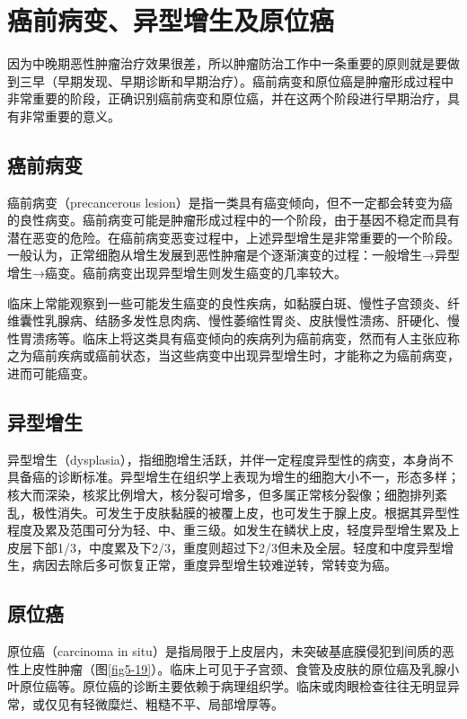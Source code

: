 \section{癌前病变、异型增生及原位癌}

因为中晚期恶性肿瘤治疗效果很差，所以肿瘤防治工作中一条重要的原则就是要做到三早（早期发现、早期诊断和早期治疗）。癌前病变和原位癌是肿瘤形成过程中非常重要的阶段，正确识别癌前病变和原位癌，并在这两个阶段进行早期治疗，具有非常重要的意义。

\subsection{癌前病变}

癌前病变（precancerous
lesion）是指一类具有癌变倾向，但不一定都会转变为癌的良性病变。癌前病变可能是肿瘤形成过程中的一个阶段，由于基因不稳定而具有潜在恶变的危险。在癌前病变恶变过程中，上述异型增生是非常重要的一个阶段。一般认为，正常细胞从增生发展到恶性肿瘤是个逐渐演变的过程：一般增生→异型增生→癌变。癌前病变出现异型增生则发生癌变的几率较大。

临床上常能观察到一些可能发生癌变的良性疾病，如黏膜白斑、慢性子宫颈炎、纤维囊性乳腺病、结肠多发性息肉病、慢性萎缩性胃炎、皮肤慢性溃疡、肝硬化、慢性胃溃疡等。临床上将这类具有癌变倾向的疾病列为癌前病变，然而有人主张应称之为癌前疾病或癌前状态，当这些病变中出现异型增生时，才能称之为癌前病变，进而可能癌变。

\subsection{异型增生}

异型增生（dysplasia），指细胞增生活跃，并伴一定程度异型性的病变，本身尚不具备癌的诊断标准。异型增生在组织学上表现为增生的细胞大小不一，形态多样；核大而深染，核浆比例增大，核分裂可增多，但多属正常核分裂像；细胞排列紊乱，极性消失。可发生于皮肤黏膜的被覆上皮，也可发生于腺上皮。根据其异型性程度及累及范围可分为轻、中、重三级。如发生在鳞状上皮，轻度异型增生累及上皮层下部1/3，中度累及下2/3，重度则超过下2/3但未及全层。轻度和中度异型增生，病因去除后多可恢复正常，重度异型增生较难逆转，常转变为癌。

\subsection{原位癌}

原位癌（carcinoma in
situ）是指局限于上皮层内，未突破基底膜侵犯到间质的恶性上皮性肿瘤（图\ref{fig5-19}）。临床上可见于子宫颈、食管及皮肤的原位癌及乳腺小叶原位癌等。原位癌的诊断主要依赖于病理组织学。临床或肉眼检查往往无明显异常，或仅见有轻微糜烂、粗糙不平、局部增厚等。

